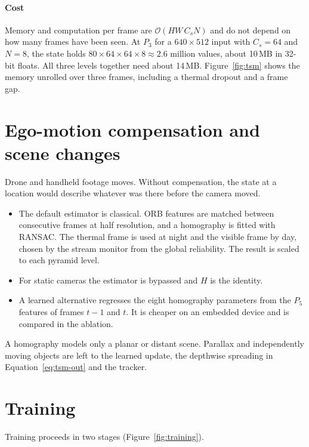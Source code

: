 \paragraph{Cost}
Memory and computation per frame are $\mathcal{O}(HW\,C_s N)$ and do not depend
on how many frames have been seen. At $P_3$ for a $640\times512$ input with
$C_s=64$ and $N=8$, the state holds $80\times64\times64\times8 \approx 2.6$
million values, about 10\,MB in 32-bit floats. All three levels together
need about 14\,MB. Figure~\ref{fig:tsm} shows the memory unrolled over three
frames, including a thermal dropout and a frame gap.



\section{Ego-motion compensation and scene changes}
\label{sec:egomotion}

Drone and handheld footage moves. Without compensation, the state at a
location would describe whatever was there before the camera moved.
\begin{itemize}
  \item The default estimator is classical. ORB features are matched between
        consecutive frames at half resolution, and a homography is fitted
        with RANSAC. The thermal frame is used at night and the visible frame
        by day, chosen by the stream monitor from the global reliability. The
        result is scaled to each pyramid level.
  \item For static cameras the estimator is bypassed and $H$ is the
        identity.
  \item A learned alternative regresses the eight homography parameters
        from the $P_5$ features of frames $t-1$ and $t$. It is cheaper on an
        embedded device and is compared in the ablation.
\end{itemize}
A homography models only a planar or distant scene. Parallax and
independently moving objects are left to the learned update, the
depthwise spreading in Equation~\eqref{eq:tsm-out} and the tracker.

\section{Training}
\label{sec:training}

Training proceeds in two stages (Figure~\ref{fig:training}).

